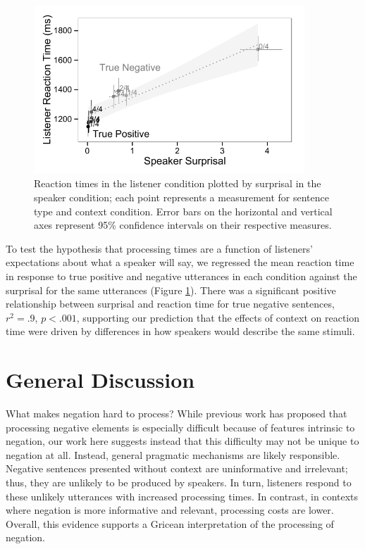 \documentclass[man, noapacite]{apa2}
\begin{document}
\begin{figure}[t]
\begin{center} 
\includegraphics[width=4in]{figures/production_rts.pdf}
\caption{\label{fig:scatter} Reaction times in the listener condition plotted by surprisal in the speaker condition; each point represents a measurement for sentence type and context condition. Error bars on the horizontal and vertical axes represent 95\% confidence intervals on their respective measures.}
\end{center} 
\end{figure}

To test the hypothesis that processing times are a function of listeners' expectations about what a speaker will say, we regressed the mean reaction time in response to true positive and negative utterances in each condition against the surprisal for the same utterances (Figure \ref{fig:scatter}).  There was a significant positive relationship between surprisal and reaction time for true negative sentences, $r^2=.9$, $p<.001$, supporting our prediction that the effects of context on reaction time were driven by differences in how speakers would describe the same stimuli.  

\section{General Discussion}

What makes negation hard to process? While previous work has proposed that processing negative elements is especially difficult because of features intrinsic to negation, our work here suggests instead that this difficulty may not be unique to negation at all. Instead, general pragmatic mechanisms are likely responsible. Negative sentences presented without context are uninformative and irrelevant; thus, they are unlikely to be produced by speakers. In turn, listeners respond to these unlikely utterances with increased processing times. In contrast, in contexts where negation is more informative and relevant, processing costs are lower. Overall, this evidence supports a Gricean interpretation of the processing of negation.
\end{document}
